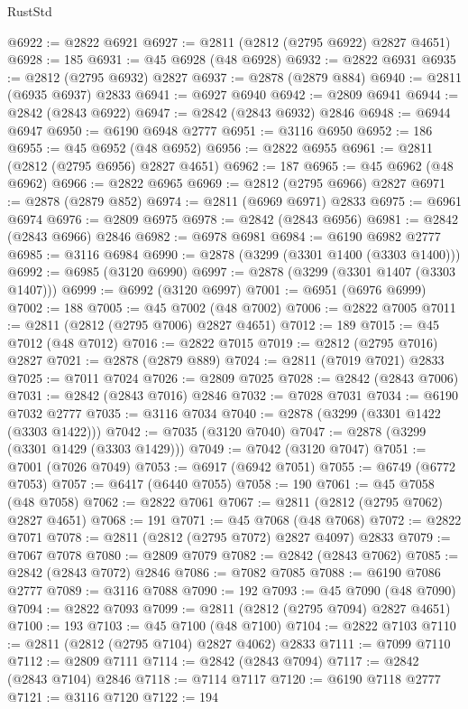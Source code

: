 \begin{lexlean}{RustStd}
\begin{coremodule}
@6922 := @2822 @6921
@6927 := @2811 (@2812 (@2795 @6922) @2827 @4651)
@6928 := 185
@6931 := @45 @6928 (@48 @6928)
@6932 := @2822 @6931
@6935 := @2812 (@2795 @6932) @2827
@6937 := @2878 (@2879 @884)
@6940 := @2811 (@6935 @6937) @2833
@6941 := @6927 @6940
@6942 := @2809 @6941
@6944 := @2842 (@2843 @6922)
@6947 := @2842 (@2843 @6932) @2846
@6948 := @6944 @6947
@6950 := @6190 @6948 @2777
@6951 := @3116 @6950
@6952 := 186
@6955 := @45 @6952 (@48 @6952)
@6956 := @2822 @6955
@6961 := @2811 (@2812 (@2795 @6956) @2827 @4651)
@6962 := 187
@6965 := @45 @6962 (@48 @6962)
@6966 := @2822 @6965
@6969 := @2812 (@2795 @6966) @2827
@6971 := @2878 (@2879 @852)
@6974 := @2811 (@6969 @6971) @2833
@6975 := @6961 @6974
@6976 := @2809 @6975
@6978 := @2842 (@2843 @6956)
@6981 := @2842 (@2843 @6966) @2846
@6982 := @6978 @6981
@6984 := @6190 @6982 @2777
@6985 := @3116 @6984
@6990 := @2878 (@3299 (@3301 @1400 (@3303 @1400)))
@6992 := @6985 (@3120 @6990)
@6997 := @2878 (@3299 (@3301 @1407 (@3303 @1407)))
@6999 := @6992 (@3120 @6997)
@7001 := @6951 (@6976 @6999)
@7002 := 188
@7005 := @45 @7002 (@48 @7002)
@7006 := @2822 @7005
@7011 := @2811 (@2812 (@2795 @7006) @2827 @4651)
@7012 := 189
@7015 := @45 @7012 (@48 @7012)
@7016 := @2822 @7015
@7019 := @2812 (@2795 @7016) @2827
@7021 := @2878 (@2879 @889)
@7024 := @2811 (@7019 @7021) @2833
@7025 := @7011 @7024
@7026 := @2809 @7025
@7028 := @2842 (@2843 @7006)
@7031 := @2842 (@2843 @7016) @2846
@7032 := @7028 @7031
@7034 := @6190 @7032 @2777
@7035 := @3116 @7034
@7040 := @2878 (@3299 (@3301 @1422 (@3303 @1422)))
@7042 := @7035 (@3120 @7040)
@7047 := @2878 (@3299 (@3301 @1429 (@3303 @1429)))
@7049 := @7042 (@3120 @7047)
@7051 := @7001 (@7026 @7049)
@7053 := @6917 (@6942 @7051)
@7055 := @6749 (@6772 @7053)
@7057 := @6417 (@6440 @7055)
@7058 := 190
@7061 := @45 @7058 (@48 @7058)
@7062 := @2822 @7061
@7067 := @2811 (@2812 (@2795 @7062) @2827 @4651)
@7068 := 191
@7071 := @45 @7068 (@48 @7068)
@7072 := @2822 @7071
@7078 := @2811 (@2812 (@2795 @7072) @2827 @4097) @2833
@7079 := @7067 @7078
@7080 := @2809 @7079
@7082 := @2842 (@2843 @7062)
@7085 := @2842 (@2843 @7072) @2846
@7086 := @7082 @7085
@7088 := @6190 @7086 @2777
@7089 := @3116 @7088
@7090 := 192
@7093 := @45 @7090 (@48 @7090)
@7094 := @2822 @7093
@7099 := @2811 (@2812 (@2795 @7094) @2827 @4651)
@7100 := 193
@7103 := @45 @7100 (@48 @7100)
@7104 := @2822 @7103
@7110 := @2811 (@2812 (@2795 @7104) @2827 @4062) @2833
@7111 := @7099 @7110
@7112 := @2809 @7111
@7114 := @2842 (@2843 @7094)
@7117 := @2842 (@2843 @7104) @2846
@7118 := @7114 @7117
@7120 := @6190 @7118 @2777
@7121 := @3116 @7120
@7122 := 194

\end{coremodule}
\end{lexlean}
